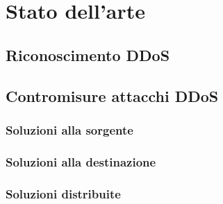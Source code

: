 \chapter{Stato dell'arte}

\section{Riconoscimento DDoS}

\section{Contromisure attacchi DDoS}

\subsection{Soluzioni alla sorgente}

\subsection{Soluzioni alla destinazione}

\subsection{Soluzioni distribuite}